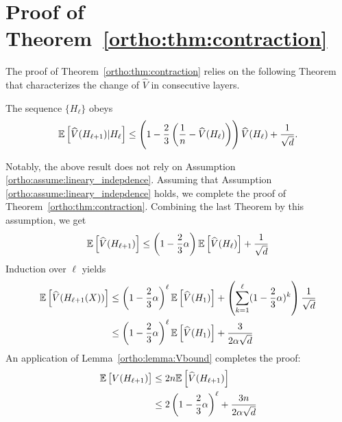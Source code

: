  \section{Proof of Theorem~\ref{ortho:thm:contraction}}
 
 The proof of Theorem~\ref{ortho:thm:contraction} relies on the following Theorem that characterizes the change of $\widehat{V}$ in consecutive layers. 
 \begin{theorem} \label{ortho:thm:single_update}
 The sequence $\{ H_\ell \}$ obeys
 \begin{align*}
  \mathbb{E} \left[ \widehat{V}(H_{\ell+1}) | H_\ell \right] \leq \left(1- \frac{2}{3} \left(\frac{1}{n}- \widehat{V}(H_\ell)\right) \right) \widehat{V}(H_\ell) + \frac{1}{\sqrt{d}}.
 \end{align*}
 \end{theorem}
 Notably, the above result does not rely on Assumption \ref{ortho:assume:lineary_indepdence}.  Assuming that  Assumption \ref{ortho:assume:lineary_indepdence} holds, we complete the proof of Theorem~\ref{ortho:thm:contraction}. Combining the last Theorem by this assumption, we get 
 \begin{align} \label{ortho:eq:lyp_condition}
     \mathbb{E} \left[ \widehat{V}(H_{\ell+1}) \right] \leq \left(1-\frac{2}{3}\alpha\right) \mathbb{E} \left[ 
 \widehat{V}(H_\ell)\right] + \frac{1}{\sqrt{d}} 
 \end{align}
 Induction over $\ell$ yields
 \begin{align*}
     \mathbb{E} \left[ \widehat{V}(H_{\ell+1}(X)) \right] & \leq  \left(1-\frac{2}{3}\alpha\right)^{\ell} \mathbb{E} \left[ 
 \widehat{V}(H_1)\right] + \left(\sum_{k=1}^\ell (1-\frac{2}{3}\alpha)^k\right)\frac{1}{\sqrt{d}} \\
     & \leq \left(1-\frac{2}{3}\alpha\right)^{\ell} \mathbb{E} \left[ 
 \widehat{V}(H_1)\right] + \frac{3}{2\alpha\sqrt{d}} 
 \end{align*}
 An application of Lemma~\ref{ortho:lemma:Vbound} completes the proof: 
 \begin{align*}
     \mathbb{E} \left[ V(H_{\ell+1}) \right] & \leq 2 n \mathbb{E} \left[ \widehat{V}(H_{\ell+1}) \right] \\ 
     & \leq 2 \left(1-\frac{2}{3}\alpha\right)^{\ell}+ \frac{3 n}{2 \alpha\sqrt{d}} 
 \end{align*}
